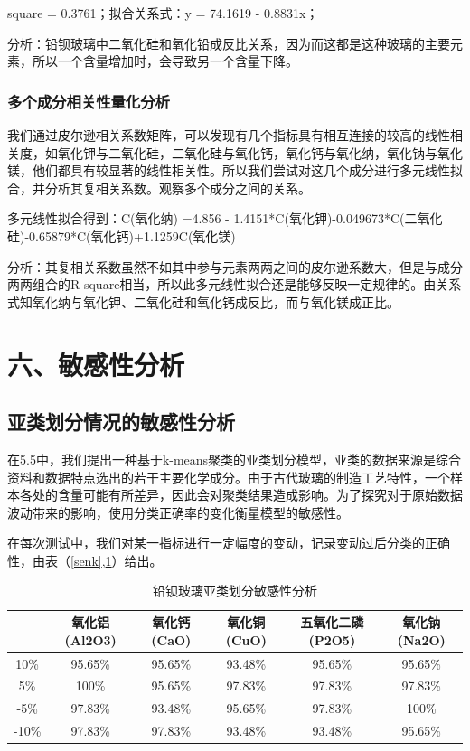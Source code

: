 \documentclass{my_paper}
\begin{document}
square = 0.3761；拟合关系式：y = 74.1619 - 0.8831x；

分析：铅钡玻璃中二氧化硅和氧化铅成反比关系，因为而这都是这种玻璃的主要元素，所以一个含量增加时，会导致另一个含量下降。

\subsubsection{多个成分相关性量化分析}

我们通过皮尔逊相关系数矩阵，可以发现有几个指标具有相互连接的较高的线性相关度，如氧化钾与二氧化硅，二氧化硅与氧化钙，氧化钙与氧化纳，氧化钠与氧化镁，他们都具有较显著的线性相关性。所以我们尝试对这几个成分进行多元线性拟合，并分析其复相关系数。观察多个成分之间的关系。

多元线性拟合得到：C(氧化纳) =4.856 - 1.4151*C(氧化钾)-0.049673*C(二氧化硅)-0.65879*C(氧化钙)+1.1259C(氧化镁)

分析：其复相关系数虽然不如其中参与元素两两之间的皮尔逊系数大，但是与成分两两组合的R-square相当，所以此多元线性拟合还是能够反映一定规律的。由关系式知氧化纳与氧化钾、二氧化硅和氧化钙成反比，而与氧化镁成正比。

\section{六、敏感性分析}
\subsection{亚类划分情况的敏感性分析}
在5.5中，我们提出一种基于k-means聚类的亚类划分模型，亚类的数据来源是综合资料和数据特点选出的若干主要化学成分。由于古代玻璃的制造工艺特性，一个样本各处的含量可能有所差异，因此会对聚类结果造成影响。为了探究对于原始数据波动带来的影响，使用分类正确率的变化衡量模型的敏感性。

在每次测试中，我们对某一指标进行一定幅度的变动，记录变动过后分类的正确性，由表（\ref{senk},\ref{senb}）给出。

\begin{longtable}{cccccc}
\caption{铅钡玻璃亚类划分敏感性分析}
\label{senb} \\
\toprule
& 氧化铝(Al2O3) & 氧化钙(CaO) & 氧化铜(CuO) & 五氧化二磷(P2O5) & 氧化钠(Na2O) \\\midrule
10\%  & 95.65\%    & 95.65\%  & 93.48\%  & 95.65\%     & 95.65\%   \\
5\%   & 100\%      & 95.65\%  & 97.83\%  & 97.83\%     & 97.83\%   \\
-5\%  & 97.83\%    & 93.48\%  & 95.65\%  & 97.83\%     & 100\%     \\
-10\% & 97.83\%    & 97.83\%  & 93.48\%  & 93.48\%     & 95.65\%   \\
\bottomrule
\end{longtable}  
\end{document}
